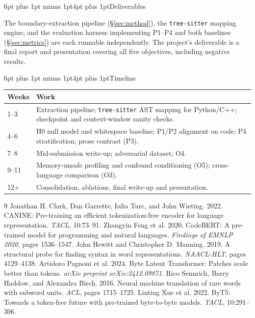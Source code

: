 \documentclass[9pt]{extarticle}
\makeatletter
\renewcommand\section{\@startsection{section}{1}{0pt}%
  {6pt plus 1pt minus 1pt}{4pt plus 1pt}{\normalfont\large\bfseries}}
\newcommand{\code}[1]{\texttt{\small #1}}
\makeatother
\begin{document}
\section{Deliverables}

The boundary-extraction pipeline (\S\ref{sec:method}), the \code{tree-sitter}
mapping engine, and the evaluation harness implementing P1--P4 and both
baselines (\S\ref{sec:metrics}) are each runnable independently. The
project's deliverable is a final report and presentation covering all five
objectives, including negative results.

\section{Timeline}

\begin{center}
\small
\begin{tabular}{@{}p{1.1cm}p{5.9cm}@{}}
\toprule
\textbf{Weeks} & \textbf{Work} \\
\midrule
1--3   & Extraction pipeline; \code{tree-sitter} AST mapping for Python/C++;
          checkpoint and context-window sanity checks. \\
4--6   & H0 null model and whitespace baseline; P1/P2 alignment on code; P4
          stratification; prose contrast (P3). \\
7--8   & Mid-submission write-up; adversarial dataset; O4. \\
9--11  & Memory-unsafe profiling and confound conditioning (O5); cross-language
          comparison (O3). \\
12+    & Consolidation, ablations, final write-up and presentation. \\
\bottomrule
\end{tabular}
\label{tab:timeline}
\end{center}

\begin{thebibliography}{9}
\footnotesize\setlength{\itemsep}{1pt}\setlength{\parskip}{0pt}
 Jonathan H. Clark, Dan Garrette,
Iulia Turc, and John Wieting. 2022. CANINE: Pre-training an efficient
tokenization-free encoder for language representation. \emph{TACL}, 10:73--91.
 Zhangyin Feng et al. 2020.
CodeBERT: A pre-trained model for programming and natural languages.
\emph{Findings of EMNLP 2020}, pages 1536--1547.
 John Hewitt and
Christopher D. Manning. 2019. A structural probe for finding syntax in word
representations. \emph{NAACL-HLT}, pages 4129--4138.
 Artidoro Pagnoni et al. 2024.
Byte Latent Transformer: Patches scale better than tokens. \emph{arXiv preprint
arXiv:2412.09871}.
 Rico Sennrich, Barry Haddow, and
Alexandra Birch. 2016. Neural machine translation of rare words with subword
units. \emph{ACL}, pages 1715--1725.
 Linting Xue et al. 2022. ByT5: Towards a
token-free future with pre-trained byte-to-byte models. \emph{TACL}, 10:291--306.
\end{thebibliography}
\end{document}
